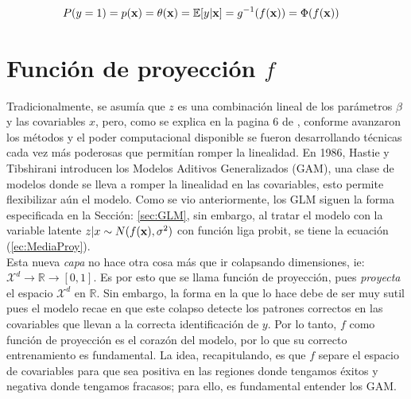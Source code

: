 \documentclass[../Main/Main.tex]{subfiles}
\begin{document}
\begin{align} \label{ec:MediaProy}
	P(y = 1) = p(\mathbf{x}) &= \theta(\mathbf{x}) =\mathbb{E}[y|\mathbf{x}] = g^{-1}(f(\mathbf{x})) = \Phi(f(\mathbf{x}))
\end{align}

\section{Función de proyección $f$} \label{sec:FuncProy} 
Tradicionalmente, se asumía que $z$ es una combinación lineal de los parámetros $\beta$ y las covariables $x$, pero, como se explica en la pagina 6 de \autocite{james2013introduction}, conforme avanzaron los métodos y el poder computacional disponible se fueron desarrollando técnicas cada vez más poderosas que permitían romper la linealidad. En 1986, Hastie y Tibshirani introducen los Modelos Aditivos Generalizados (GAM), una clase de modelos donde se lleva a romper la linealidad en las covariables, esto permite flexibilizar aún el modelo. Como se vio anteriormente, los GLM siguen la forma especificada en la Sección: \ref{sec:GLM}, sin embargo, al tratar el modelo con la variable latente $z|x \sim N(f(\mathbf{x}),\sigma^2)$ con función liga probit, se tiene la ecuación (\ref{ec:MediaProy}).\\

Esta nueva \textit{capa} no hace otra cosa más que ir colapsando dimensiones, ie: $\mathcal{X}^d \rightarrow \mathbb{R} \rightarrow [0,1]$. Es por esto que se llama función de proyección, pues \textit{proyecta} el espacio $\mathcal{X}^d$ en  $\mathbb{R}$. Sin embargo, la forma en la que lo hace debe de ser muy sutil pues el modelo recae en que este colapso detecte los patrones correctos en las covariables que llevan a la correcta identificación de $y$. Por lo tanto, $f$ como función de proyección es el corazón del modelo, por lo que su correcto entrenamiento es fundamental. La idea, recapitulando, es que $f$ separe el espacio de covariables para que sea positiva en las regiones donde tengamos éxitos y negativa donde tengamos fracasos; para ello, es fundamental entender los GAM.\\
\end{document}
